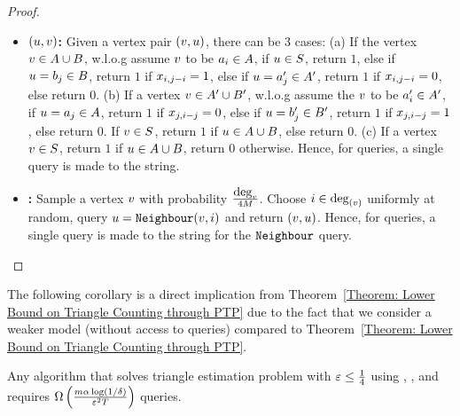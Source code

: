 \begin{proof}
\begin{itemize}
        \item \textbf{\edgeexistsq$\left({u,v}\right)$:} Given a vertex pair $\left({v,u}\right)$, there can be 3 cases: (a) If the vertex $v \in A\cup B$, w.l.o.g assume $v$ to be $a_i \in A$, if $u \in S$, return $1$, else if $u = b_j \in B$, return $1$ if $x_{i,j-i} = 1$, else if $u = a'_j \in A'$, return $1$ if $x_{i,j-i} = 0$, else return $0$. (b) If a vertex $v \in A'\cup B'$, w.l.o.g assume the $v$ to be $a'_i \in A'$, if $u = a_j \in A$, return $1$ if $x_{j,i-j} = 0$, else if $u = b'_j \in B'$, return $1$ if $x_{j,i-j} = 1$, else return $0$. If $v \in S$, return $1$ if $u \in A\cup B$, else return $0$. (c) If a vertex $v \in S$, return $1$ if $u \in A \cup B$, return $0$ otherwise. Hence, for \edgeexistsq{} queries, a single query is made to the string.

        \item \textbf{\randedgeq{}:} Sample a vertex $v$ with probability $\frac{\mbox{deg}_{v}}{4M}$. Choose $i \in \mbox{deg}_{\left({v}\right)}$ uniformly at random, query $u = \texttt{Neighbour}{\left({v,i}\right)}$ and return $\left({v,u}\right)$. Hence, for \randedgeq{} queries, a single query is made to the string for the $\texttt{Neighbour}{}$ query.
    \end{itemize}
\end{proof}

The following corollary is a direct implication from Theorem~\ref{Theorem: Lower Bound on Triangle Counting through PTP} due to the fact that we consider a weaker model (without access to \randedgeq{} queries) compared to Theorem~\ref{Theorem: Lower Bound on Triangle Counting through PTP}.

\begin{corollary}\label{Theorem: Lower Bound on Triangle Counting w/o Random Edge}
Any algorithm that solves triangle estimation problem with $\varepsilon \leq \frac{1}{4}$ using \degreeq{}, \neighbourq{}, and \edgeexistsq{} requires $\Omega\left({\frac{m\alpha\log\left({1/\delta}\right)}{\varepsilon^2T}}\right)$ queries.    
\end{corollary}